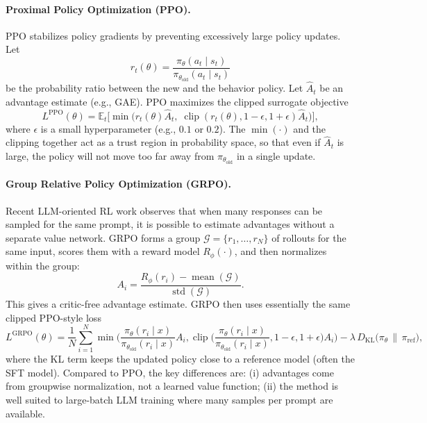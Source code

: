 \paragraph{Proximal Policy Optimization (PPO).}
PPO \cite{schulman2017proximalpolicyoptimizationalgorithms} stabilizes policy gradients by preventing excessively large policy updates. Let
\[
r_t(\theta) = \frac{\pi_\theta(a_t \mid s_t)}{\pi_{\theta_{\text{old}}}(a_t \mid s_t)}
\]
be the probability ratio between the new and the behavior policy. Let $\hat A_t$ be an advantage estimate (e.g., GAE). PPO maximizes the clipped surrogate objective
\[
L^{\text{PPO}}(\theta) = \mathbb{E}_t \bigg[ \min\big( r_t(\theta) \hat A_t,\; \operatorname{clip}(r_t(\theta), 1 - \epsilon, 1 + \epsilon) \hat A_t \big) \bigg],
\]
where $\epsilon$ is a small hyperparameter (e.g., $0.1$ or $0.2$). The $\min(\cdot)$ and the clipping together act as a trust region in probability space, so that even if $\hat A_t$ is large, the policy will not move too far away from $\pi_{\theta_{\text{old}}}$ in a single update.

\paragraph{Group Relative Policy Optimization (GRPO).}
Recent LLM-oriented RL work observes that when many responses can be sampled for the same prompt, it is possible to estimate advantages without a separate value network. GRPO forms a group $\mathcal{G} = \{r_1, \dots, r_N\}$ of rollouts for the same input, scores them with a reward model $R_\phi(\cdot)$, and then normalizes within the group:
\[
A_i = \frac{R_\phi(r_i) - \operatorname{mean}(\mathcal{G})}{\operatorname{std}(\mathcal{G})}.
\]
This gives a critic-free advantage estimate. GRPO then uses essentially the same clipped PPO-style loss
\[
L^{\text{GRPO}}(\theta) = \frac{1}{N} \sum_{i=1}^{N}
\min \bigg(
\frac{\pi_\theta(r_i \mid x)}{\pi_{\theta_{\text{old}}}(r_i \mid x)} A_i,
\operatorname{clip}\Big(\frac{\pi_\theta(r_i \mid x)}{\pi_{\theta_{\text{old}}}(r_i \mid x)}, 1 - \epsilon, 1 + \epsilon \Big) A_i
\bigg)
 - \lambda \, D_{\mathrm{KL}}\big(\pi_\theta \,\|\, \pi_{\text{ref}}\big),
\]
where the KL term keeps the updated policy close to a reference model (often the SFT model). Compared to PPO, the key differences are: (i) advantages come from groupwise normalization, not a learned value function; (ii) the method is well suited to large-batch LLM training where many samples per prompt are available.

